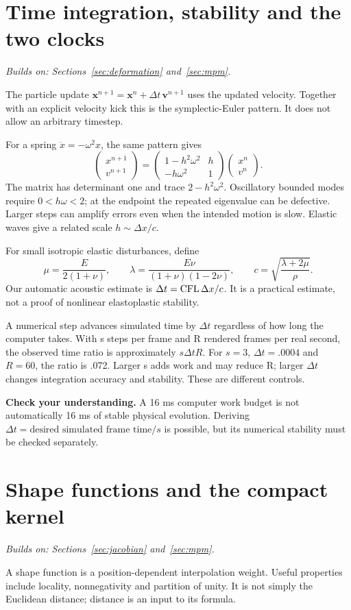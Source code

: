 \documentclass[11pt,a4paper]{article}
\newcommand{\mat}[1]{\mathbf{#1}}
\newcommand{\prereq}[1]{\textit{Builds on: #1}\par}
\newcommand{\checkpoint}[1]{\par\textbf{Check your understanding.} #1\par}
\numberwithin{equation}{section}
\begin{document}
\section{Time integration, stability and the two clocks}\label{sec:time}
\prereq{Sections~\ref{sec:deformation} and~\ref{sec:mpm}.}
The particle update $\mat x^{n+1}=\mat x^n+\Delta t\,\mat v^{n+1}$ uses the
updated velocity. Together with an explicit velocity kick this is the
symplectic-Euler pattern. It does not allow an arbitrary timestep.

For a spring $\ddot x=-\omega^2x$, the same pattern gives
\[
\begin{pmatrix}x^{n+1}\\v^{n+1}\end{pmatrix}
=\begin{pmatrix}1-h^2\omega^2&h\\-h\omega^2&1\end{pmatrix}
\begin{pmatrix}x^n\\v^n\end{pmatrix}.
\]
The matrix has determinant one and trace $2-h^2\omega^2$. Oscillatory bounded
modes require $0<h\omega<2$; at the endpoint the repeated eigenvalue can be
defective. Larger steps can amplify errors even when the intended motion is
slow. Elastic waves give a related scale $h\sim\Delta x/c$.

For small isotropic elastic disturbances, define
\[
\mu=\frac{E}{2(1+\nu)},\qquad
\lambda=\frac{E\nu}{(1+\nu)(1-2\nu)},\qquad
c=\sqrt{\frac{\lambda+2\mu}{\rho}}.
\]
Our automatic acoustic estimate is $\Delta t={\rm CFL}\,\Delta x/c$.
It is a practical estimate, not a proof of nonlinear elastoplastic stability.

A numerical step advances simulated time by $\Delta t$ regardless of how long
the computer takes. With s steps per frame and R rendered frames per real
second, the observed time ratio is approximately $s\Delta t R$.
For $s=3$, $\Delta t=.0004$ and $R=60$, the ratio is .072.
Larger s adds work and may reduce R; larger $\Delta t$ changes integration
accuracy and stability. These are different controls.
\checkpoint{A 16 ms computer work budget is not automatically 16 ms of stable
physical evolution. Deriving $\Delta t=\text{desired simulated frame time}/s$
is possible, but its numerical stability must be checked separately.}

\section{Shape functions and the compact kernel}\label{sec:kernel}
\prereq{Sections~\ref{sec:jacobian} and~\ref{sec:mpm}.}
A shape function is a position-dependent interpolation weight. Useful properties
include locality, nonnegativity and partition of unity. It is not simply the
Euclidean distance; distance is an input to its formula.
\end{document}
